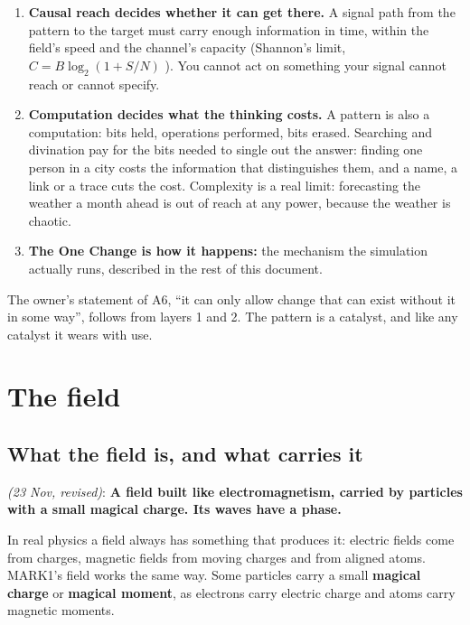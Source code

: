 \documentclass[11pt,a4paper]{article}
\newcommand{\decision}[3]{\par\smallskip\noindent{\color{dec}\textbf{Decision #1}} \textit{(#2)}: \textbf{#3}\par}
\begin{document}
\begin{enumerate}
  \item \textbf{Causal reach decides whether it can get there.} A signal path from the pattern to the target must carry enough information in time, within the field's speed and the channel's capacity (Shannon's limit, $C = B\log_2(1+S/N)$ \cite{shannon}). You cannot act on something your signal cannot reach or cannot specify.

  \item \textbf{Computation decides what the thinking costs.} A pattern is also a computation: bits held, operations performed, bits erased. Searching and divination pay for the bits needed to single out the answer: finding one person in a city costs the information that distinguishes them, and a name, a link or a trace cuts the cost. Complexity is a real limit: forecasting the weather a month ahead is out of reach at any power, because the weather is chaotic.

  \item \textbf{The One Change is how it happens:} the mechanism the simulation actually runs, described in the rest of this document.
\end{enumerate}

The owner's statement of A6, ``it can only allow change that can exist without it in some way'', follows from layers 1 and 2. The pattern is a catalyst, and like any catalyst it wears with use.

\section{The field}\label{sec:field}

\subsection{What the field is, and what carries it}

\decision{Q1.1}{23 Nov, revised}{A field built like electromagnetism, carried by particles with a small magical charge. Its waves have a phase.}

In real physics a field always has something that produces it: electric fields come from charges, magnetic fields from moving charges and from aligned atoms. MARK1's field works the same way. Some particles carry a small \textbf{magical charge} or \textbf{magical moment}, as electrons carry electric charge and atoms carry magnetic moments.
\end{document}
